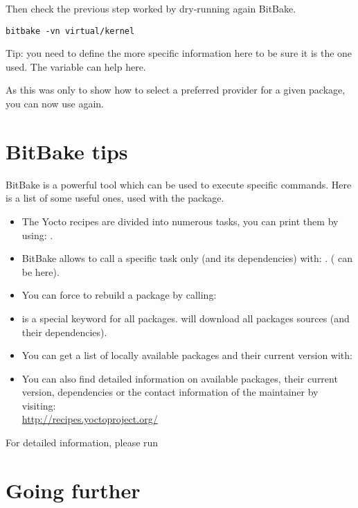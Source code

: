 Then check the previous step worked by dry-running again BitBake.
\begin{verbatim}
bitbake -vn virtual/kernel
\end{verbatim}

Tip: you need to define the more specific information here to be sure it is the
one used. The  variable can help here.

As this was only to show how to select a preferred provider for a
given package, you can now use  again.

\section{BitBake tips}

BitBake is a powerful tool which can be used to execute specific commands. Here
is a list of some useful ones, used with the  package.

\begin{itemize}
  \item The Yocto recipes are divided into numerous tasks, you can print them
        by using: .
  \item BitBake allows to call a specific task only (and its dependencies)
        with: . ( can be
         here).
  \item You can force to rebuild a package by calling: 
  \item {} is a special keyword for all packages.  will download all packages sources (and their
        dependencies).
  \item You can get a list of locally available packages and their current
        version with: \\
  \item You can also find detailed information on available packages, their
        current version, dependencies or the contact information of the
        maintainer by visiting: \\
        \url{http://recipes.yoctoproject.org/}
\end{itemize}

For detailed information, please run 

\section{Going further}


